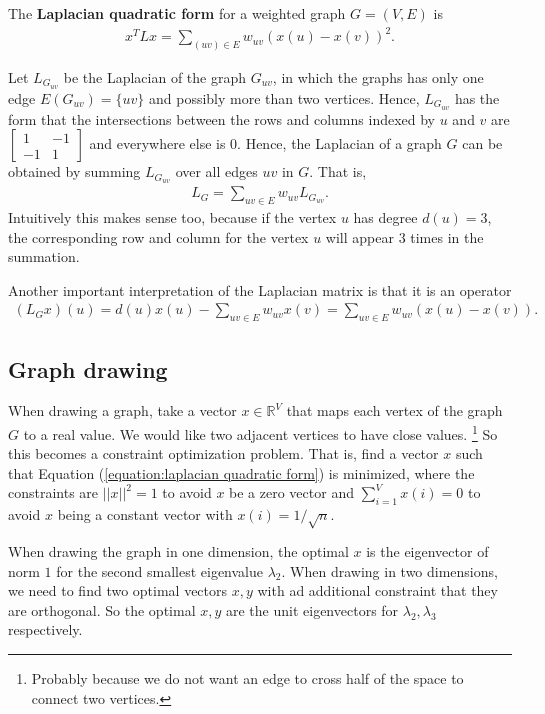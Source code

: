 \documentclass[]{article}
\begin{document}
	The \textbf{Laplacian quadratic form} for a weighted graph $G=(V,E)$ is 
	\begin{align}
	\label{equation:laplacian quadratic form}
	x^T L x = \sum_{(uv) \in E} w_{uv} (x(u) - x(v))^2.
	\end{align}
	
	Let $L_{G_{uv}}$ be the Laplacian of the graph $G_{uv}$, in which the graphs has only one edge $E(G_{uv})=\{uv\}$ and possibly more than two vertices. Hence, $L_{G_{uv}}$ has the form that the intersections between the rows and columns indexed by $u$ and $v$ are $\begin{bmatrix}
	1 & -1 \\
	-1 & 1
	\end{bmatrix}$ and everywhere else is $0$. Hence, the Laplacian of a graph $G$ can be obtained by summing $L_{G_{uv}}$ over all edges $uv$ in $G$. That is, 
	\begin{align*}
	L_G = \sum_{uv \in E} w_{uv} L_{G_{uv}}.
	\end{align*}
	Intuitively this makes sense too, because if the vertex $u$ has degree $d(u)=3$, the corresponding row and column for the vertex $u$ will appear $3$ times in the summation. 
	
	Another important interpretation of the Laplacian matrix is that it is an operator 
	\begin{align*}
	(L_Gx)(u) = d(u)x(u) - \sum_{uv \in E}w_{uv}x(v) = \sum_{uv \in E} w_{uv}(x(u)-x(v)).
	\end{align*}
	
	\subsection{Graph drawing}
	When drawing a graph, take a vector $x \in \mathbb{R}^V$ that maps each vertex of the graph $G$ to a real value. We would like two adjacent vertices to have close values. \footnote{Probably because we do not want an edge to cross half of the space to connect two vertices.} So this becomes a constraint optimization problem. That is, find a vector $x$ such that Equation (\ref{equation:laplacian quadratic form}) is minimized, where the constraints are $||x||^2=1$ to avoid $x$ be a zero vector and $\sum_{i=1}^V x(i) = 0$ to avoid $x$ being a constant vector with $x(i)=1/\sqrt{n}$.
	
	When drawing the graph in one dimension, the optimal $x$ is the eigenvector of norm $1$ for the second smallest eigenvalue $\lambda_2$. When drawing in two dimensions, we need to find two optimal vectors $x,y$ with ad additional constraint that they are orthogonal. So the optimal $x,y$ are the unit eigenvectors for $\lambda_2,\lambda_3$ respectively. 
	
\end{document}
